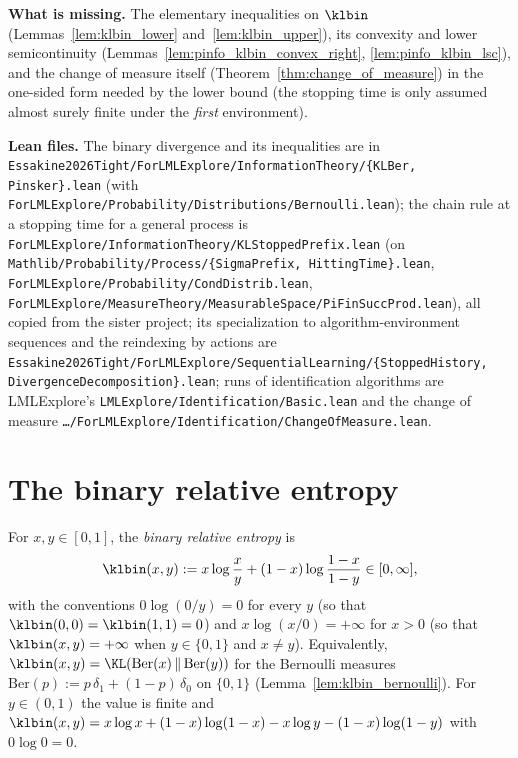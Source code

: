\textbf{What is missing.} The elementary inequalities on $\klbin$
(Lemmas~\ref{lem:klbin_lower} and~\ref{lem:klbin_upper}), its convexity and lower semicontinuity
(Lemmas~\ref{lem:pinfo_klbin_convex_right}, \ref{lem:pinfo_klbin_lsc}), and the change of measure
itself (Theorem~\ref{thm:change_of_measure}) in the one-sided form needed by the lower bound
(the stopping time is only assumed almost surely finite under the \emph{first} environment).

\textbf{Lean files.} The binary divergence and its inequalities are in
\texttt{Essakine2026Tight/ForLMLExplore/InformationTheory/\{KLBer, Pinsker\}.lean} (with
\texttt{ForLMLExplore/Probability/Distributions/Bernoulli.lean}); the chain rule at a stopping time for a
general process is \texttt{ForLMLExplore/InformationTheory/KLStoppedPrefix.lean} (on
\texttt{Mathlib/Probability/Process/\{SigmaPrefix, HittingTime\}.lean},
\texttt{ForLMLExplore/Probability/CondDistrib.lean},
\texttt{ForLMLExplore/MeasureTheory/MeasurableSpace/PiFinSuccProd.lean}), all copied from the sister
project; its specialization to algorithm-environment sequences and the reindexing by actions are
\texttt{Essakine2026Tight/ForLMLExplore/SequentialLearning/\{StoppedHistory,
DivergenceDecomposition\}.lean}; runs of identification algorithms are
LMLExplore's \texttt{LMLExplore/Identification/Basic.lean} and the change of measure
\texttt{…/ForLMLExplore/Identification/ChangeOfMeasure.lean}.

\section{The binary relative entropy}
\label{sec:pinfo_klbin}

\begin{definition}\label{def:klbin}
\leanok
For $x, y \in [0, 1]$, the \emph{binary relative entropy} is
\[
  \klbin(x, y) := x\log\frac{x}{y} + (1 - x)\log\frac{1 - x}{1 - y} \in [0, \infty],
\]
with the conventions $0\log(0/y) = 0$ for every $y$ (so that $\klbin(0, 0) = \klbin(1, 1) = 0$)
and $x\log(x/0) = +\infty$ for $x > 0$ (so that $\klbin(x, y) = +\infty$ when $y \in \{0, 1\}$
and $x \ne y$). Equivalently, $\klbin(x, y) = \KL(\mathrm{Ber}(x)\,\|\,\mathrm{Ber}(y))$ for the
Bernoulli measures $\mathrm{Ber}(p) := p\,\delta_1 + (1 - p)\,\delta_0$ on $\{0, 1\}$
(Lemma~\ref{lem:klbin_bernoulli}). For $y \in (0, 1)$ the value is finite and
$\klbin(x, y) = x\log x + (1-x)\log(1-x) - x\log y - (1-x)\log(1-y)$ with $0\log 0 = 0$.
\end{definition}

